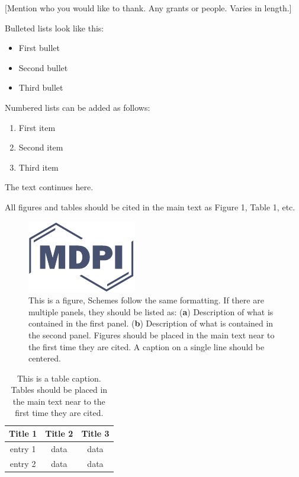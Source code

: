 \documentclass[,article,submit,moreauthors,pdftex]{mdpi}
\providecommand{\tightlist}{%
  \setlength{\itemsep}{0pt}\setlength{\parskip}{0pt}}
\begin{document}
{[}Mention who you would like to thank. Any grants or people. Varies in
length.{]}

Bulleted lists look like this:

\begin{itemize}
\tightlist
\item
  First bullet
\item
  Second bullet
\item
  Third bullet
\end{itemize}

Numbered lists can be added as follows:

\begin{enumerate}
\def\labelenumi{\arabic{enumi}.}
\tightlist
\item
  First item
\item
  Second item
\item
  Third item
\end{enumerate}

The text continues here.

All figures and tables should be cited in the main text as Figure 1,
Table 1, etc.

\begin{figure}[H]
\centering
\includegraphics[width=3 cm]{logo-mdpi}
\caption{This is a figure, Schemes follow the same formatting. If there are multiple panels, they should be listed as: (\textbf{a}) Description of what is contained in the first panel. (\textbf{b}) Description of what is contained in the second panel. Figures should be placed in the main text near to the first time they are cited. A caption on a single line should be centered.}
\end{figure}

\begin{table}[H]
\caption{This is a table caption. Tables should be placed in the main text near to the first time they are cited.}
\centering
\begin{tabular}{ccc}
\toprule
\textbf{Title 1}    & \textbf{Title 2}  & \textbf{Title 3}\\
\midrule
entry 1     & data          & data\\
entry 2     & data          & data\\
\bottomrule
\end{tabular}
\end{table}
\end{document}
